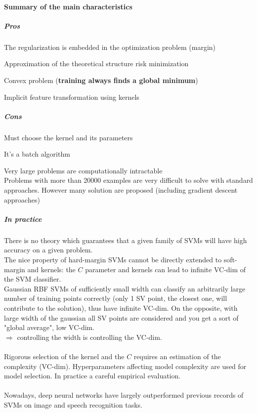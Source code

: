 \documentclass[10pt]{report}
\begin{document}
\paragraph{Summary of the main characteristics}
\subparagraph{Pros}
\begin{list}{}{}
	\item The regularization is embedded in the optimization problem (margin)
	\item Approximation of the theoretical structure risk minimization
	\item Convex problem (\textbf{training always finds a global minimum})
	\item Implicit feature transformation using kernels
\end{list}
\subparagraph{Cons}
\begin{list}{}{}
	\item Must choose the kernel and its parameters
	\item It's a batch algorithm
	\item Very large problems are computationally intractable\\
	Problems with more than 20000 examples are very difficult to solve with standard approaches. However many solution are proposed (including gradient descent approaches)
\end{list}
\subparagraph{In practice} There is no theory which guarantees that a given family of SVMs will have high accuracy on a given problem.\\
The nice property of hard-margin SVMs cannot be directly extended to soft-margin and kernels: the $C$ parameter and kernels can lead to infinite VC-dim of the SVM classifier.\\
Gaussian RBF SVMs of sufficiently small width can classify an arbitrarily large number of training points correctly (only 1 SV point, the closest one, will contribute to the solution), thus have infinite VC-dim. On the opposite, with large width of the gaussian all SV points are considered and you get a sort of "global average", low VC-dim.\\
$\Rightarrow$ controlling the width is controlling the VC-dim.\\\\
Rigorous selection of the kernel and the $C$ requires an estimation of the complexity (VC-dim). Hyperparameters affecting model complexity are used for model selection. In practice a careful empirical evaluation.\\\\
Nowadays, deep neural networks have largely outperformed previous records of SVMs on image and speech recognition tasks.
\end{document}
